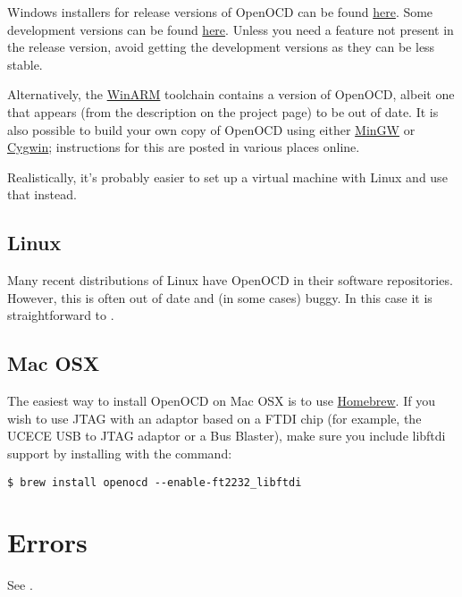 Windows installers for release versions of OpenOCD can be found
\href{http://www.freddiechopin.info/index.php/en/download/category/4-openocd}{here}.
Some development versions can be found
\href{http://www.freddiechopin.info/index.php/en/download/category/10-openocd-dev}{here}.
Unless you need a feature not present in the release version, avoid
getting the development versions as they can be less stable.

Alternatively, the
\href{http://www.siwawi.arubi.uni-kl.de/avr_projects/arm_projects/}{WinARM}
toolchain contains a version of OpenOCD, albeit one that appears (from
the description on the project page) to be out of date. It is also
possible to build your own copy of OpenOCD using either
\href{http://www.mingw.org/}{MinGW} or
\href{http://www.cygwin.com/}{Cygwin}; instructions for this are posted
in various places online.

Realistically, it's probably easier to set up a virtual machine with
Linux and use that instead.

\subsection{Linux}
\label{linux}

Many recent distributions of Linux have OpenOCD in their software
repositories. However, this is often out of date and (in some cases)
buggy. In this case it is straightforward to
.

\subsection{Mac OSX}
\label{mac-osx}

The easiest way to install OpenOCD on Mac OSX is to use
\href{http://brew.sh/}{Homebrew}. If you wish to use JTAG with an
adaptor based on a FTDI chip (for example, the UCECE USB to JTAG
adaptor or a Bus Blaster), make sure you include libftdi support by
installing with the command:
%
\begin{verbatim}
$ brew install openocd --enable-ft2232_libftdi
\end{verbatim}

\section{Errors}
\label{errors}

See .
